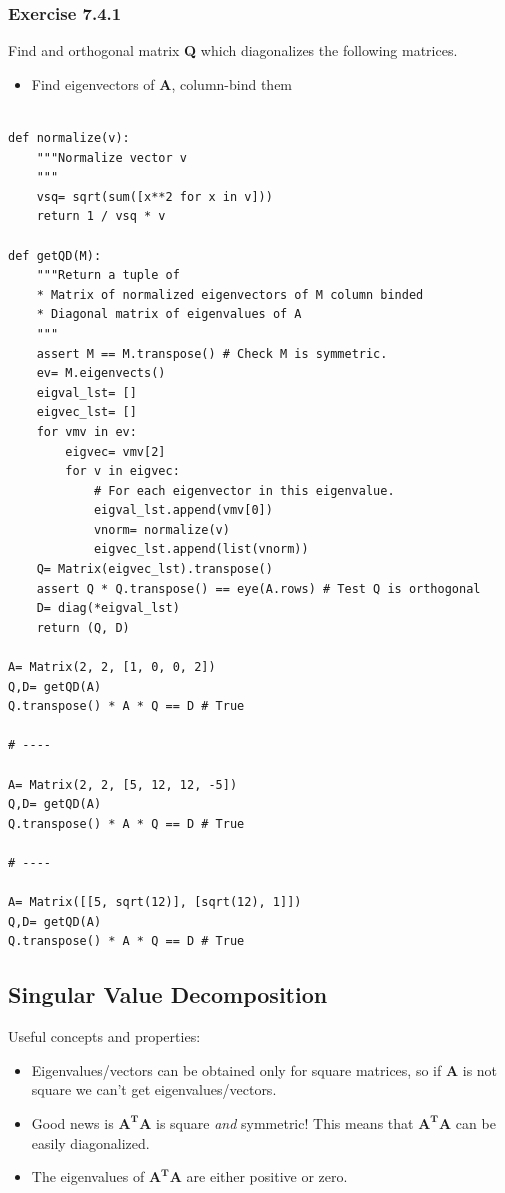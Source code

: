 \subsubsection{Exercise 7.4.1}

Find and orthogonal matrix \textbf{Q} which diagonalizes the following matrices.

\begin{itemize}
\item Find eigenvectors of \textbf{A}, column-bind them
\end{itemize}

\begin{verbatim}

def normalize(v):
    """Normalize vector v
    """
    vsq= sqrt(sum([x**2 for x in v]))
    return 1 / vsq * v 

def getQD(M):
    """Return a tuple of
    * Matrix of normalized eigenvectors of M column binded
    * Diagonal matrix of eigenvalues of A
    """
    assert M == M.transpose() # Check M is symmetric.
    ev= M.eigenvects()
    eigval_lst= []
    eigvec_lst= []
    for vmv in ev:
        eigvec= vmv[2]
        for v in eigvec:
            # For each eigenvector in this eigenvalue.
            eigval_lst.append(vmv[0])
            vnorm= normalize(v)
            eigvec_lst.append(list(vnorm))
    Q= Matrix(eigvec_lst).transpose()
    assert Q * Q.transpose() == eye(A.rows) # Test Q is orthogonal
    D= diag(*eigval_lst)
    return (Q, D)

A= Matrix(2, 2, [1, 0, 0, 2])
Q,D= getQD(A)
Q.transpose() * A * Q == D # True

# ----

A= Matrix(2, 2, [5, 12, 12, -5])
Q,D= getQD(A)
Q.transpose() * A * Q == D # True

# ----

A= Matrix([[5, sqrt(12)], [sqrt(12), 1]])
Q,D= getQD(A)
Q.transpose() * A * Q == D # True
\end{verbatim}


\subsection{Singular Value Decomposition}

Useful concepts and properties:

\begin{itemize}
\item Eigenvalues/vectors can be obtained only for square matrices, so if \textbf{A}
is not square we can't get eigenvalues/vectors.
\item Good news is $\mathbf{A^TA}$ is square \emph{and} symmetric! This means that
$\mathbf{A^TA}$ can be easily diagonalized.
\item The eigenvalues of $\mathbf{A^TA}$ are either positive or zero.
\end{itemize}

